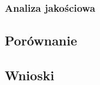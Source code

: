 \documentclass{article}
\begin{document}
\subsubsection{Analiza jakościowa}

\subsection{Porównanie}

\subsection{Wnioski}

\newpage
\printbibliography
\end{document}
